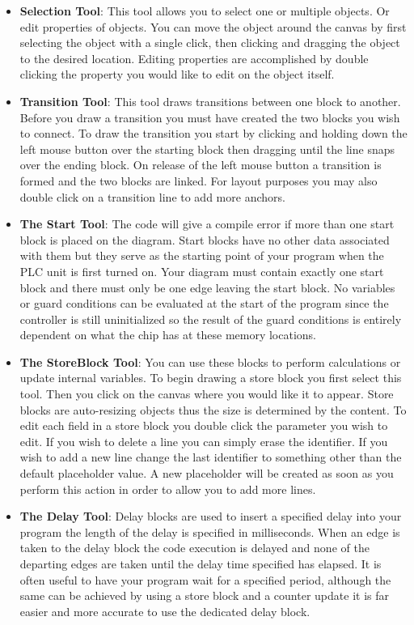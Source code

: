 \begin{itemize}
\item \textbf{Selection Tool}: This tool allows you to select one or multiple objects. Or edit properties of objects. You can move the object around the canvas by first selecting the object with a single click, then clicking and dragging the object to the desired location. Editing properties are accomplished by double clicking the property you would like to edit on the object itself.

\item \textbf{Transition Tool}: This tool draws transitions between one block to another. Before you draw a transition you must have created the two blocks you wish to connect. To draw the transition you start by clicking and holding down the left mouse button over the starting block then dragging until the line snaps over the ending block. On release of the left mouse button a transition is formed and the two blocks are linked. For layout purposes you may also double click on a transition  line to add more anchors.

\item \textbf{The Start Tool}: The code will give a compile error if more than one start block is placed on the diagram. Start blocks have no other data associated with them but they serve as the starting point of your program when the PLC unit is first turned on. Your diagram must contain exactly one start block and there must only be one edge leaving the start block. No variables or guard conditions can be evaluated at the start of the program since the controller is still uninitialized so the result of the guard conditions is entirely dependent on what the chip has at these memory locations.

\item \textbf{The StoreBlock Tool}: You can use these blocks to perform calculations or update internal variables. To begin drawing a store block you first select this tool. Then you click on the canvas where you would like it to appear. Store blocks are auto-resizing objects thus the size is determined by the content. To edit each field in a store block you double click the parameter you wish to edit. If you wish to delete a line you can simply erase the identifier. If you wish to add a new line change the last identifier to something other than the default placeholder value. A new placeholder will be created as soon as you perform this action in order to allow you to add more lines.

\item \textbf{The Delay Tool}: Delay blocks are used to insert a specified delay into your program the length of the delay is specified in milliseconds. When an edge is taken to the delay block the code execution is delayed and none of the departing edges are taken until the delay time specified has elapsed. It is often useful to have your program wait for a specified period, although the same can be achieved by using a store block and a counter update it is far easier and more accurate to use the dedicated delay block.


\end{itemize}
